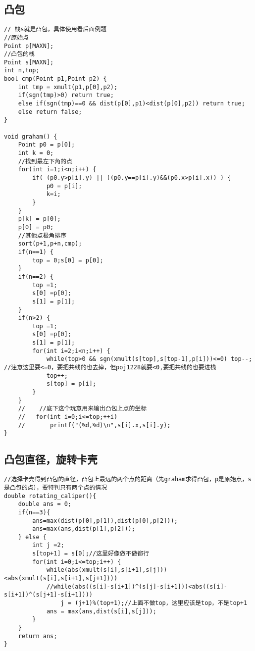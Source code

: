 \subsection{凸包}
\begin{lstlisting}
// 栈s就是凸包，具体使用看后面例题
//原始点
Point p[MAXN];
//凸包的栈
Point s[MAXN];
int n,top;
bool cmp(Point p1,Point p2) {
	int tmp = xmult(p1,p[0],p2);
	if(sgn(tmp)>0) return true;
	else if(sgn(tmp)==0 && dist(p[0],p1)<dist(p[0],p2)) return true;
	else return false;
}

void graham() {
	Point p0 = p[0];
	int k = 0;
	//找到最左下角的点
	for(int i=1;i<n;i++) {
		if( (p0.y>p[i].y) || ((p0.y==p[i].y)&&(p0.x>p[i].x)) ) {
			p0 = p[i];
			k=i;
		}
	}
	p[k] = p[0];
	p[0] = p0;
	//其他点极角排序
	sort(p+1,p+n,cmp);
	if(n==1) {
		top = 0;s[0] = p[0];
	}
	if(n==2) {
		top =1;
		s[0] =p[0];
		s[1] = p[1];
	}
	if(n>2) {
		top =1;
		s[0] =p[0];
		s[1] = p[1];
		for(int i=2;i<n;i++) {
			while(top>0 && sgn(xmult(s[top],s[top-1],p[i]))<=0) top--; //注意这里要<=0，要把共线的也去掉，但poj1228就要<0,要把共线的也要进栈
			top++;
			s[top] = p[i];
		}
	}
	//    //底下这个玩意用来输出凸包上点的坐标
	//   for(int i=0;i<=top;++i)
	//       printf("(%d,%d)\n",s[i].x,s[i].y);
}
\end{lstlisting}

\subsection{凸包直径，旋转卡壳}
\begin{lstlisting}
//选择卡壳得到凸包的直径，凸包上最远的两个点的距离（先graham求得凸包，p是原始点，s是凸包的点），要特判只有两个点的情况
double rotating_caliper(){
	double ans = 0;
	if(n==3){
		ans=max(dist(p[0],p[1]),dist(p[0],p[2]));
		ans=max(ans,dist(p[1],p[2]));
	} else {
		int j =2;
		s[top+1] = s[0];//这里好像做不做都行
		for(int i=0;i<=top;i++) {
			while(abs(xmult(s[i],s[i+1],s[j]))<abs(xmult(s[i],s[i+1],s[j+1])))
			//while(abs((s[i]-s[i+1])^(s[j]-s[i+1]))<abs((s[i]-s[i+1])^(s[j+1]-s[i+1])))
				j = (j+1)%(top+1);//上面不做top，这里应该是top，不是top+1
			ans = max(ans,dist(s[i],s[j]));
		}
	}
	return ans;
}
\end{lstlisting}

